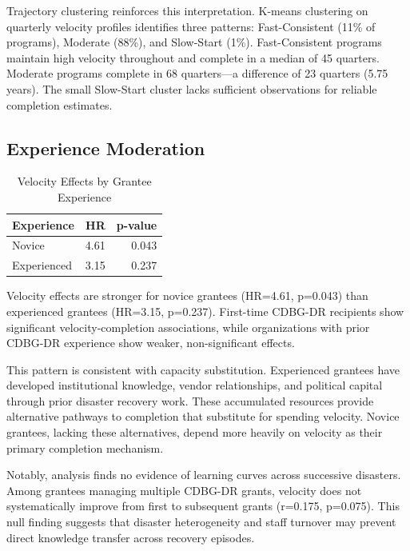 \documentclass[
  12pt,
  letterpaper,
]{article}
\begin{document}
Trajectory clustering reinforces this interpretation. K-means clustering
on quarterly velocity profiles identifies three patterns:
Fast-Consistent (11\% of programs), Moderate (88\%), and Slow-Start
(1\%). Fast-Consistent programs maintain high velocity throughout and
complete in a median of 45 quarters. Moderate programs complete in 68
quarters---a difference of 23 quarters (5.75 years). The small
Slow-Start cluster lacks sufficient observations for reliable completion
estimates.

\subsection{Experience Moderation}\label{experience-moderation}

\begin{longtable}[]{@{}lrr@{}}

\caption{\label{tbl-experience}Velocity Effects by Grantee Experience}

\tabularnewline

\toprule\noalign{}
Experience & HR & p-value \\
\midrule\noalign{}
\endhead
\bottomrule\noalign{}
\endlastfoot
Novice & 4.61 & 0.043 \\
Experienced & 3.15 & 0.237 \\

\end{longtable}

Velocity effects are stronger for novice grantees (HR=4.61, p=0.043)
than experienced grantees (HR=3.15, p=0.237). First-time CDBG-DR
recipients show significant velocity-completion associations, while
organizations with prior CDBG-DR experience show weaker, non-significant
effects.

This pattern is consistent with capacity substitution. Experienced
grantees have developed institutional knowledge, vendor relationships,
and political capital through prior disaster recovery work. These
accumulated resources provide alternative pathways to completion that
substitute for spending velocity. Novice grantees, lacking these
alternatives, depend more heavily on velocity as their primary
completion mechanism.

Notably, analysis finds no evidence of learning curves across successive
disasters. Among grantees managing multiple CDBG-DR grants, velocity
does not systematically improve from first to subsequent grants
(r=0.175, p=0.075). This null finding suggests that disaster
heterogeneity and staff turnover may prevent direct knowledge transfer
across recovery episodes.
\end{document}
